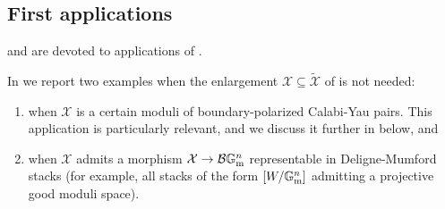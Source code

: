 \documentclass{amsart}
\newcommand{\bG}{\mathbb{G}}
\newcommand{\cB}{\mathcal{B}}
\newcommand{\cX}{\mathcal{X}}
\newcommand{\Gm}{\bG_{{\rm m}}}
\theoremstyle{definition}
\theoremstyle{definition}
\begin{document}
 \subsection{First applications}  and  are devoted to applications of .
 
{In  we report two examples when the enlargement $\cX\subseteq \widetilde{\cX}$ of  is not needed:
\begin{enumerate}
\item when $\cX$ is a certain moduli of boundary-polarized Calabi-Yau pairs. This application is particularly relevant, and we discuss it further in  below, and
    \item when $\cX$ admits a morphism $\cX\to \cB\Gm^n$ representable in Deligne-Mumford stacks (for example, all stacks of the form $[W/\Gm^n]$ admitting a projective good moduli space).
    \end{enumerate}  }
\end{document}
